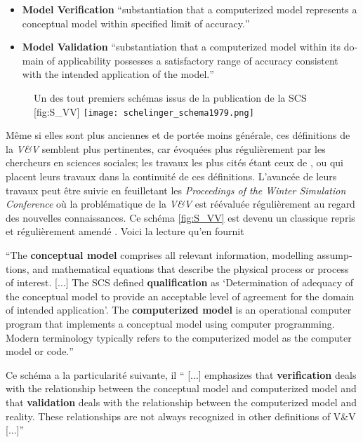 \begin{itemize}
\item \textbf{Model Verification} \foreignquote{english}{substantiation that a computerized model represents a conceptual model within specified limit of accuracy.}
\item \textbf{Model Validation} \foreignquote{english}{substantiation that a computerized model within its domain of applicability possesses a satisfactory range of accuracy consistent with the intended application of the model.}
\end{itemize}

\begin{figure}[h]
\begin{sidecaption}[fortoc]{Un des tout premiers schémas issus de la publication de la SCS \autocite{Oberkampf2010,Schlesinger1979}}[fig:S_VV]
  \centering
 \texttt{[image: schelinger\_schema1979.png]}
  \end{sidecaption}
\end{figure}

Même si elles sont plus anciennes et de portée moins générale, ces définitions de la \textit{V\&V} semblent plus pertinentes, car évoquées plus régulièrement par les chercheurs en sciences sociales; les travaux les plus cités étant ceux de \textcite{Kleijnen1995}, ou \textcite{Sargent2010} qui placent leurs travaux dans la continuité de ces définitions. L'avancée de leurs travaux peut être suivie en feuilletant les \textit{Proceedings of the Winter Simulation Conference} où la problématique de la \textit{V\&V} est réévaluée régulièrement au regard des nouvelles connaissances. Ce schéma \ref{fig:S_VV} est devenu un classique repris et régulièrement amendé \autocite{Sargent2010}. Voici la lecture qu'en fournit \autocite{Oberkampf2010}

\foreignquote{english}{The \textbf{conceptual model} comprises all relevant information, modelling assumptions, and mathematical equations that describe the physical process or process of interest. [...] The SCS defined \textbf{qualification} as \enquote{Determination of adequacy of the conceptual model to provide an acceptable level of agreement for the domain of intended application}. The \textbf{computerized model} is an operational computer program that implements a conceptual model using computer programming. Modern terminology typically refers to the computerized model as the computer model or code.}

Ce schéma a la particularité suivante, il \foreignquote{english}{ [...] emphasizes that \textbf{verification} deals with the relationship between the conceptual model and computerized model and that \textbf{validation} deals with the relationship between the computerized model and reality. These relationships are not always recognized in other definitions of V\&V [...]}


